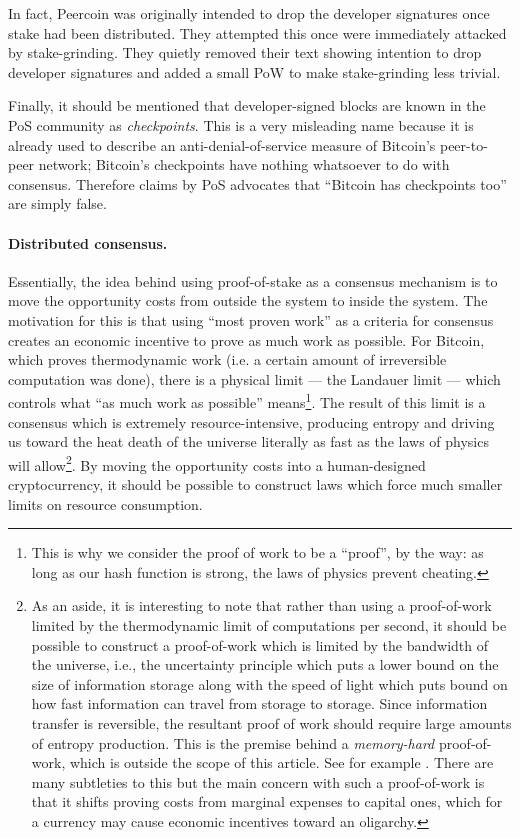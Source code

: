 \documentclass[letterpaper]{article}
\begin{document}
In fact, Peercoin was originally intended to drop the developer signatures once stake
had been distributed. They attempted this once were immediately attacked by stake-grinding.
They quietly removed their text showing intention to drop developer signatures and added
a small PoW to make stake-grinding less trivial.

Finally, it should be mentioned that developer-signed blocks are known in the PoS
community as \emph{checkpoints}. This is a very misleading name because it is already
used to describe an anti-denial-of-service measure of Bitcoin's peer-to-peer network;
Bitcoin's checkpoints have nothing whatsoever to do with consensus. Therefore claims
by PoS advocates that ``Bitcoin has checkpoints too'' are simply false.

\paragraph{Distributed consensus.}
Essentially, the idea behind using proof-of-stake as a consensus mechanism is to
move the opportunity costs from outside the system to inside the system. The
motivation for this is that using ``most proven work'' as a criteria for consensus
creates an economic incentive to prove as much work as possible. For Bitcoin, which
proves thermodynamic work (i.e. a certain amount of irreversible computation was
done), there is a physical limit --- the Landauer limit --- which controls what
``as much work as possible'' means\footnote{This is why we consider the proof of work to
be a ``proof'', by the way: as long as our hash function is strong, the laws of
physics prevent cheating.}. The result
of this limit is a consensus which is
extremely resource-intensive, producing entropy and driving us toward the heat death
of the universe literally as fast as the laws of physics will allow\footnote{As an
aside, it is interesting
to note that rather than using a proof-of-work limited
by the thermodynamic limit of computations per second, it should be possible to
construct a proof-of-work which is limited by the bandwidth of the universe, i.e.,
the uncertainty principle which puts a lower bound on the size of information storage
along with the speed of light which puts bound on how fast information can travel from
storage to storage. Since information transfer is reversible, the resultant proof of
work should require large amounts of entropy production. This is the premise behind a
\emph{memory-hard} proof-of-work, which is outside the scope of this article. See
for example \cite{tromp}. There are many subtleties to this but the main
concern with such a proof-of-work is that it shifts proving costs from marginal
expenses to capital ones, which for a currency may cause economic incentives toward
an oligarchy.}.
By moving the opportunity costs into a human-designed cryptocurrency, it should be
possible to construct laws which force much smaller limits on resource consumption.
\end{document}
